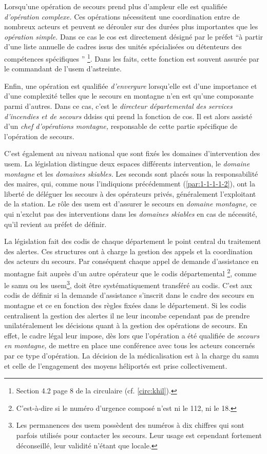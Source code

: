 Lorsqu'une opération de secours prend plus d'ampleur elle est
qualifiée \emph{d'opération complexe.} Ces opérations nécessitent une
coordination entre de nombreux acteurs et peuvent se dérouler sur des
durées plus importantes que les \emph{opération simple.} Dans ce cas
le \ac{cos} est directement désigné par le préfet \enquote{à partir
  d’une liste annuelle de cadres issus des unités spécialisées ou
  détenteurs des compétences spécifiques \textelp{}} \footnote{Section
  4.2 page 8 de la circulaire 
  (cf. \autoref{circ:khil}).}. Dans les faits, cette fonction est
souvent assurée par le commandant de l'\ac{usem} d'astreinte.

Enfin, une opération est qualifiée \emph{d'envergure} lorsqu'elle est
d'une importance et d'une complexité telles que le secours en montagne
n'en est qu'une composante parmi d'autres. Dans ce cas, c'est le
\emph{directeur départemental des services d'incendies et de secours}
\acp{ddsis} qui prend la fonction de \ac{cos}. Il est alors assisté
d'un \emph{chef d'opérations montagne,} responsable de cette partie
spécifique de l'opération de secours.

C'est également au niveau national que sont fixés les domaines
d'intervention des \ac{usem}. La législation distingue deux espaces
différents intervention, le \emph{domaine montagne} et les
\emph{domaines skiables.} Les seconds sont placés sous la
responsabilité des maires, qui, comme nous l'indiquions précédemment
(\ref{par:1-1-1-1-2}), ont la liberté de déléguer les secours à des
opérateurs privés, généralement l'exploitant de la station. Le rôle
des \ac{usem} est d'assurer le secours en \emph{domaine montagne,} ce
qui n’exclut pas des interventions dans les \emph{domaines skiables} en
cas de nécessité, qu'il revient au préfet de définir.

La législation fait des \ac{codis} de chaque département le point
central du traitement des alertes. Ces structures ont à charge la
gestion des appels et la coordination des acteurs du secours. Par
conséquent chaque appel de demande d'assistance en montagne fait
auprès d'un autre opérateur que le \ac{codis} départemental
\footnote{C'est-à-dire si le numéro d'urgence composé n'est ni le 112,
  ni le 18.}, comme le \ac{samu} ou les \ac{usem}\footnote{Les
  permanences des \ac{usem} possèdent des numéros à dix chiffres qui
  sont parfois utilisés pour contacter les secours. Leur usage est
  cependant fortement déconseillé, leur validité n'étant que locale.},
doit être systématiquement transféré au \ac{codis}. C'est aux
\ac{codis} de définir si la demande d'assistance s'inscrit dans le
cadre des secours en montagne et ce en fonction des règles fixées dans
le département.  Si les \ac{codis} centralisent la gestion des alertes
il ne leur incombe cependant pas de prendre unilatéralement les
décisions quant à la gestion des opérations de secours. En effet, le
cadre légal leur impose, dès lors que l’opération a été qualifiée de
\emph{secours en montagne,} de mettre en place une conférence avec
tous les acteurs concernés par ce type d'opération. La décision de la
médicalisation est à la charge du \ac{samu} et celle de l'engagement
des moyens héliportés est prise collectivement.


